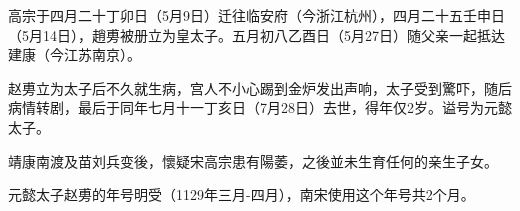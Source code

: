 高宗于四月二十丁卯日（5月9日）迁往临安府（今浙江杭州），四月二十五壬申日（5月14日），趙旉被册立为皇太子。五月初八乙酉日（5月27日）随父亲一起抵达建康（今江苏南京）。

赵旉立为太子后不久就生病，宫人不小心踢到金炉发出声响，太子受到驚吓，随后病情转剧，最后于同年七月十一丁亥日（7月28日）去世，得年仅2岁。谥号为元懿太子。

靖康南渡及苗刘兵变後，懷疑宋高宗患有陽萎，之後並未生育任何的亲生子女。

元懿太子赵旉的年号明受（1129年三月-四月），南宋使用这个年号共2个月。



